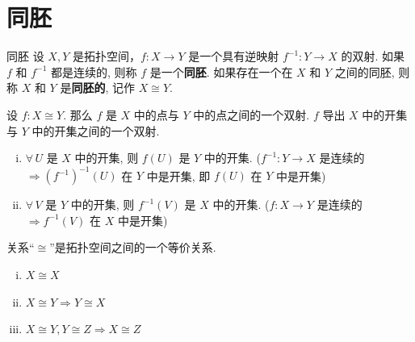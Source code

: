\section{同胚}

\begin{definition}{同胚}
    设 $X,Y$ 是拓扑空间，$f:X\to Y$ 是一个具有逆映射 $f^{-1}:Y\to X$ 的双射.
    如果 $f$ 和 $f^{-1}$ 都是连续的, 则称 $f$ 是一个\textbf{同胚}.
    如果存在一个在 $X$ 和 $Y$ 之间的同胚, 则称 $X$ 和 $Y$ 是\textbf{同胚的}, 记作 $X\cong Y$.
\end{definition}

\begin{remark}
    设 $f:X\cong Y$. 那么 $f$ 是 $X$ 中的点与 $Y$ 中的点之间的一个双射. $f$ 导出 $X$ 中的开集与 $Y$ 中的开集之间的一个双射.
    \begin{enumerate}[(i)]
        \item $\forall\, U$ 是 $X$ 中的开集, 则 $f(U)$ 是 $Y$ 中的开集.
        ($f^{-1}:Y\to X$ 是连续的 $\Rightarrow (f^{-1})^{-1}(U)$ 在 $Y$ 中是开集, 即 $f(U)$ 在 $Y$ 中是开集)
        \item $\forall\, V$ 是 $Y$ 中的开集, 则 $f^{-1}(V)$ 是 $X$ 中的开集.
        ($f:X\to Y$ 是连续的 $\Rightarrow f^{-1}(V)$ 在 $X$ 中是开集)
    \end{enumerate}
\end{remark}

\begin{proposition}
    关系“$\cong$”是拓扑空间之间的一个等价关系.
    \begin{enumerate}[(i)]
        \item $X\cong X$
        \item $X\cong Y \Rightarrow Y\cong X$
        \item $X\cong Y, Y\cong Z \Rightarrow X\cong Z$
    \end{enumerate}
\end{proposition}

